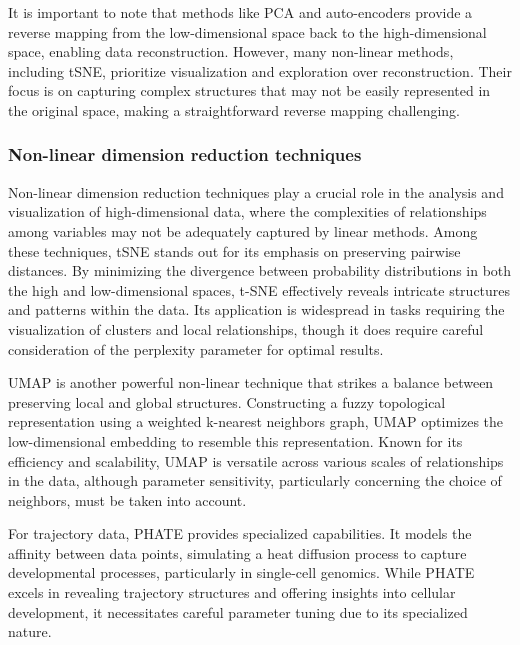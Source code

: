 \documentclass[
  12pt]{article}
\begin{document}
It is important to note that methods like PCA and auto-encoders
\citep{article65} provide a reverse mapping from the low-dimensional
space back to the high-dimensional space, enabling data reconstruction.
However, many non-linear methods, including tSNE, prioritize
visualization and exploration over reconstruction. Their focus is on
capturing complex structures that may not be easily represented in the
original space, making a straightforward reverse mapping challenging.

\hypertarget{non-linear-dimension-reduction-techniques}{%
\subsubsection{Non-linear dimension reduction
techniques}\label{non-linear-dimension-reduction-techniques}}

Non-linear dimension reduction techniques play a crucial role in the
analysis and visualization of high-dimensional data, where the
complexities of relationships among variables may not be adequately
captured by linear methods. Among these techniques, tSNE stands out for
its emphasis on preserving pairwise distances. By minimizing the
divergence between probability distributions in both the high and
low-dimensional spaces, t-SNE effectively reveals intricate structures
and patterns within the data. Its application is widespread in tasks
requiring the visualization of clusters and local relationships, though
it does require careful consideration of the perplexity parameter for
optimal results.

UMAP is another powerful non-linear technique that strikes a balance
between preserving local and global structures. Constructing a fuzzy
topological representation using a weighted k-nearest neighbors graph,
UMAP optimizes the low-dimensional embedding to resemble this
representation. Known for its efficiency and scalability, UMAP is
versatile across various scales of relationships in the data, although
parameter sensitivity, particularly concerning the choice of neighbors,
must be taken into account.

For trajectory data, PHATE provides specialized capabilities. It models
the affinity between data points, simulating a heat diffusion process to
capture developmental processes, particularly in single-cell genomics.
While PHATE excels in revealing trajectory structures and offering
insights into cellular development, it necessitates careful parameter
tuning due to its specialized nature.
\end{document}
